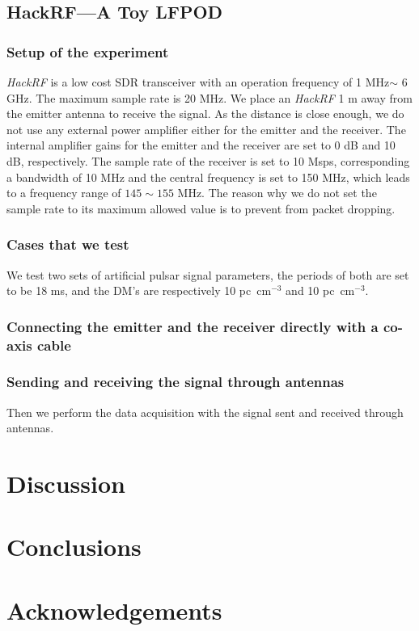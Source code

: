 \documentclass[fleqn,usenatbib]{mnras}
\begin{document}
\subsection{HackRF---A Toy LFPOD}
\subsubsection{Setup of the experiment}
\textit{HackRF} is a low cost SDR transceiver with an operation frequency of 1 MHz$\sim$ 6 GHz.
The maximum sample rate is 20 MHz.
We place an \textit{HackRF} 1 m away from the emitter antenna to receive the signal.
As the distance is close enough, we do not use any external power amplifier either for the emitter and the receiver. 
The internal amplifier gains for the emitter and the receiver are set to 0 dB and 10 dB, respectively.
The sample rate of the receiver is set to 10 Msps, corresponding a bandwidth of 10 MHz and the central frequency is set to 150 MHz, which leads to a frequency range of $145\sim 155$ MHz.
The reason why we do not set the sample rate to its maximum allowed value is to prevent from packet dropping.

\subsubsection{Cases that we test}
We test two sets of artificial pulsar signal parameters, the periods of both are set to be 18 ms, and the DM's are respectively 10 pc~cm$^{-3}$ and 10 pc~cm$^{-3}$.

\subsubsection{Connecting the emitter and the receiver directly with a co-axis cable}

\subsubsection{Sending and receiving the signal through antennas}
Then we perform the data acquisition with the signal sent and received through antennas.



\section{Discussion}

\section{Conclusions}

\section*{Acknowledgements}








\bsp	%
\label{lastpage}
\end{document}
